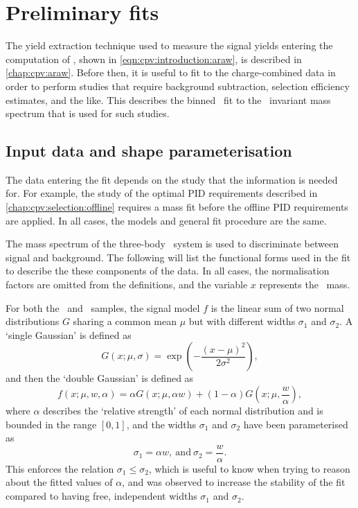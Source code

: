 \chapter{Preliminary fits}
\label{chap:cpv:prelim_fits}

The yield extraction technique used to measure the signal yields entering the 
computation of \ARaw, shown in \cref{eqn:cpv:introduction:araw}, is described 
in \cref{chap:cpv:araw}.
Before then, it is useful to fit to the charge-combined data in order to 
perform studies that require background subtraction, selection efficiency 
estimates, and the like.
This  describes the binned \chisq\ fit to the 
\phh\ invariant mass spectrum that is used for such studies.

\section{Input data and shape parameterisation}
\label{chap:cpv:prelim_fits:data_pdfs}

The data entering the fit depends on the study that the information is needed 
for.
For example, the study of the optimal \ac{PID} requirements described in 
\cref{chap:cpv:selection:offline} requires a mass fit before the offline 
\ac{PID} requirements are applied.
In all cases, the models and general fit procedure are the same.

The mass spectrum of the three-body \phh\ system is used to discriminate 
between signal and background.
The following will list the functional forms used in the fit to describe the 
these components of the data.
In all cases, the normalisation factors are omitted from the definitions, and 
the variable $x$ represents the \PLambdac\ mass.

For both the \pKK\ and \ppipi\ samples, the signal model $f$ is the linear sum 
of two normal distributions $G$ sharing a common mean $\mu$ but with different 
widths $\sigma_{1}$ and $\sigma_{2}$.
A `single Gaussian' is defined as
\begin{equation}
  G(x; \mu, \sigma) = \exp\left(-\frac{{(x - \mu)}^{2}}{2\sigma^{2}}\right),
\end{equation}
and then the `double Gaussian' is defined as
\begin{equation}
  f(x; \mu, w, \alpha) = \alpha{}G(x; \mu, \alpha{w}) +
    (1 - \alpha)G(x; \mu, \frac{w}{\alpha}),
  \label{eqn:cpv:prelim_fits:sig_model}
\end{equation}
where $\alpha$ describes the `relative strength' of each normal distribution 
and is bounded in the range $[0, 1]$, and the widths $\sigma_{1}$ and 
$\sigma_{2}$ have been parameterised as
\begin{equation}
  \sigma_{1} = \alpha{w},\ \text{and}\ \sigma_{2} = \frac{w}{\alpha}.
  \label{eqn:cpv:prelim_fits:sigma_def}
\end{equation}
This enforces the relation $\sigma_{1} \leq \sigma_{2}$, which is useful to 
know when trying to reason about the fitted values of $\alpha$, and was 
observed to increase the stability of the fit compared to having free, 
independent widths $\sigma_{1}$ and $\sigma_{2}$.


